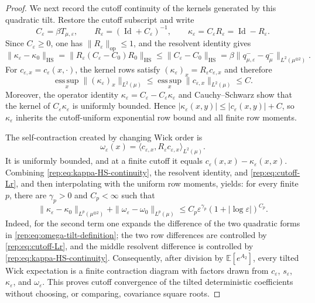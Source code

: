 \documentclass[11pt,reqno]{amsart}
\numberwithin{equation}{section}
\theoremstyle{plain}
\theoremstyle{definition}
\newcommand{\E}{\mathbb E}
\newcommand{\Id}{\operatorname{Id}}
\newcommand{\HS}{\mathrm{HS}}
\newcommand{\op}{\mathrm{op}}
\newcommand{\be}{\beta}
\newcommand{\vep}{\varepsilon}
\begin{document}
\begin{proof}
We next record the cutoff continuity of the kernels generated by this quadratic tilt.  Restore the cutoff subscript and write
\begin{equation}\label{rep:eq:tilt-resolvent-notation}
 C_\vep=\be T_{\mu,\vep},\qquad
 R_\vep=(\Id+C_\vep)^{-1},\qquad
 \kappa_\vep=C_\vep R_\vep=\Id-R_\vep.
\end{equation}
Since $C_\vep\ge0$, one has $\|R_\vep\|_{\op}\le1$, and the resolvent identity gives
\begin{equation}\label{rep:eq:kappa-HS-continuity}
 \|\kappa_\vep-\kappa_0\|_{\HS}
 =\|R_\vep(C_\vep-C_0)R_0\|_{\HS}
 \le \|C_\vep-C_0\|_{\HS}
 =\be\|q^-_{\mu,\vep}-q^-_\mu\|_{L^2(\mu^{\otimes2})}.
\end{equation}
For $c_{\vep,x}=c_\vep(x,\cdot)$, the kernel rows satisfy
$(\kappa_\vep)_x=R_\vep c_{\vep,x}$ and therefore
\begin{equation}\label{rep:eq:kappa-row-L2}
 \operatorname*{ess\,sup}_x\|(\kappa_\vep)_x\|_{L^2(\mu)}
 \le \operatorname*{ess\,sup}_x\|c_{\vep,x}\|_{L^2(\mu)}\le C.
\end{equation}
Moreover, the operator identity $\kappa_\vep=C_\vep-C_\vep\kappa_\vep$ and Cauchy--Schwarz show that the kernel of $C_\vep\kappa_\vep$ is uniformly bounded.  Hence
$|\kappa_\vep(x,y)|\le |c_\vep(x,y)|+C$, so $\kappa_\vep$ inherits the cutoff-uniform exponential row bound and all finite row moments.

The self-contraction created by changing Wick order is
\begin{equation}\label{rep:eq:omega-tilt-definition}
 \omega_\vep(x)
 =\langle c_{\vep,x},R_\vep c_{\vep,x}\rangle_{L^2(\mu)}.
\end{equation}
It is uniformly bounded, and at a finite cutoff it equals
$c_\vep(x,x)-\kappa_\vep(x,x)$.  Combining
\eqref{rep:eq:kappa-HS-continuity}, the resolvent identity, and
\eqref{rep:eq:cutoff-Lr}, and then interpolating with the uniform row moments, yields: for every finite $p$, there are $\gamma_p>0$ and $C_p<\infty$ such that
\begin{equation}\label{rep:eq:tilt-kernel-cutoff-rate}
 \|\kappa_\vep-\kappa_0\|_{L^p(\mu^{\otimes2})}
 +\|\omega_\vep-\omega_0\|_{L^p(\mu)}
 \le C_p\vep^{\gamma_p}(1+|\log\vep|)^{C_p}.
\end{equation}
Indeed, for the second term one expands the difference of the two quadratic forms in \eqref{rep:eq:omega-tilt-definition}; the two row differences are controlled by \eqref{rep:eq:cutoff-Lr}, and the middle resolvent difference is controlled by \eqref{rep:eq:kappa-HS-continuity}.  Consequently, after division by $\E[e^{A_2}]$, every tilted Wick expectation is a finite contraction diagram with factors drawn from $c_\vep$, $s_\vep$, $\kappa_\vep$, and $\omega_\vep$.  This proves cutoff convergence of the tilted deterministic coefficients without choosing, or comparing, covariance square roots.


\end{proof}
\end{document}
